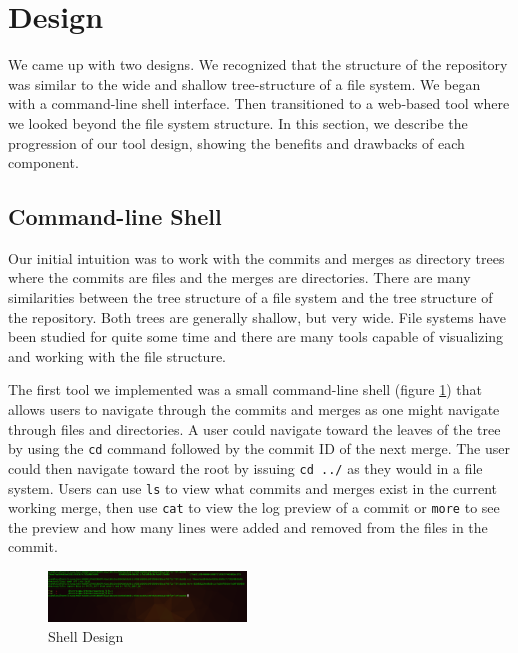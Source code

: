 \documentclass[conference, draftclsnofoot, draft]{IEEEtran}
\begin{document}
\section{Design}


We came up with two designs. We recognized that the structure of the repository was
similar to the wide and shallow tree-structure of a file system. We began with a
command-line shell interface. Then transitioned to a web-based tool where we looked
beyond the file system structure. In this section, we describe the progression of
our tool design, showing the benefits and drawbacks of each component.

\subsection{Command-line Shell}

Our initial intuition was to work with the commits and merges as directory trees
where the commits are files and the merges are directories. There are many
similarities between the tree structure of a file system and the tree structure of
the repository. Both trees are generally shallow, but very wide. File systems have
been studied for quite some time and there are many tools capable of visualizing and
working with the file structure.

The first tool we implemented was a small command-line shell (figure
\ref{fig:shell}) that allows users to navigate through the commits and merges as one
might navigate through files and directories. A user could navigate toward the
leaves of the tree by using the \verb|cd| command followed by the commit ID of the
next merge. The user could then navigate toward the root by issuing \verb|cd ../|
as they would in a file system. Users can use \verb|ls| to view what commits and
merges exist in the current working merge, then use \verb|cat| to view the log
preview of a commit or \verb|more| to see the preview and how many lines were added
and removed from the files in the commit.

\begin{figure}
        \centering
        \includegraphics[width=0.47\textwidth]{figures/shell.png}
        \caption{Shell Design}
        \label{fig:shell}
\end{figure}
\end{document}
